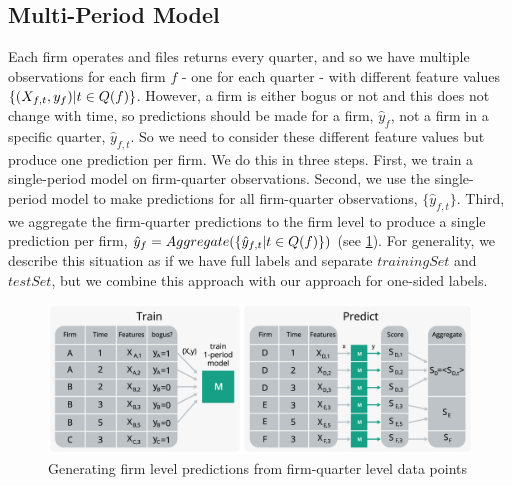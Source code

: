 \subsection{Multi-Period Model}
\label{subsec:multi-period}
Each firm operates and files returns every quarter, and so we have multiple observations for each firm $f$ - one for each quarter - with different feature values $\{(X_{f,t},y_f)\space | \space t \in Q(f)\}$. However, a firm is either bogus or not and this does not change with time, so predictions should be made for a firm, $\hat{y}_f$, not a firm in a specific quarter, $\hat{y}_{f,t}$. So we need to consider these different feature values but produce one prediction per firm. We do this in three steps. First, we train a single-period model on firm-quarter observations. Second, we use the single-period model to make predictions for all firm-quarter observations, $\{\hat{y}_{f,t}\}$. Third, we aggregate the firm-quarter predictions to the firm level to produce a single prediction per firm, $\hat{y}_f=Aggregate(\{\hat{y}_{f,t}\space|t \in Q(f)\})$ (see \cref{fig:aggregation}). For generality, we describe this situation as if we have full labels and separate $trainingSet$ and $testSet$, but we combine this approach with our approach for one-sided labels.

\begin{figure}
  \includegraphics[width=1\columnwidth]{figures/MultiplePeriodPrediction.png}
  \caption{Generating firm level predictions from firm-quarter level data points}
  \label{fig:aggregation}
\end{figure}

